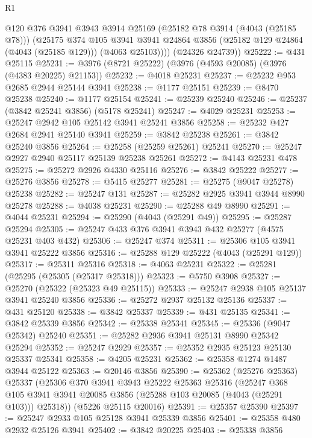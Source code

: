 \begin{lexlean}{R1}
\begin{coremodule}
          @120
          @376
          @3941
          @3943
          @3914
          @25169
          (@25182 @78 @3914 (@4043 (@25185 @78)))
          (@25175
            @374
            @105
            @3941
            @3941
            @24864
            @3856
            (@25182 @129 @24864 (@4043 (@25185 @129)))
            (@4063 @25103))))
      (@24326 @24739))
@25222 := @431 @25115
@25231 := @3976 (@8721 @25222) (@3976 (@4593 @20085) (@3976 (@4383 @20225) @21153))
@25232 := @4018 @25231
@25237 := @25232 @953 @2685 @2944 @25144 @3941
@25238 := @1177 @25151
@25239 := @8470 @25238
@25240 := @1177 @25154
@25241 := @25239 @25240
@25246 := @25237 (@3842 @25241 @3856) (@5178 @25241)
@25247 := @4029 @25231
@25253 := @25247 @2942 @105 @25142 @3941 @25241 @3856
@25258 := @25232 @427 @2684 @2941 @25140 @3941
@25259 := @3842 @25238
@25261 := @3842 @25240 @3856
@25264 := @25258 (@25259 @25261) @25241
@25270 := @25247 @2927 @2940 @25117 @25139 @25238 @25261
@25272 := @4143 @25231 @478
@25275 := @25272 @2926 @4330 @25116
@25276 := @3842 @25222
@25277 := @25276 @3856
@25278 := @5415 @25277
@25281 := @25275 (@9047 @25278) @25238
@25282 := @25247 @131
@25287 := @25282 @2925 @3941 @3944 @8990 @25278
@25288 := @4038 @25231
@25290 := @25288 @49 @8990
@25291 := @4044 @25231
@25294 := @25290 (@4043 (@25291 @49))
@25295 := @25287 @25294
@25305 := @25247 @433 @376 @3941 @3943 @432 @25277 (@4575 @25231 @403 @432)
@25306 := @25247 @374
@25311 := @25306 @105 @3941 @3941 @25222 @3856
@25316 := @25288 @129 @25222 (@4043 (@25291 @129))
@25317 := @25311 @25316
@25318 := @4063 @25231
@25322 := @25281 (@25295 (@25305 (@25317 @25318)))
@25323 := @5750 @3908
@25327 := @25270 (@25322 (@25323 @49 @25115))
@25333 := @25247 @2938 @105 @25137 @3941 @25240 @3856
@25336 := @25272 @2937 @25132 @25136
@25337 := @431 @25120
@25338 := @3842 @25337
@25339 := @431 @25135
@25341 := @3842 @25339 @3856
@25342 := @25338 @25341
@25345 := @25336 (@9047 @25342) @25240
@25351 := @25282 @2936 @3941 @25131 @8990 @25342 @25294
@25352 := @25247 @2929
@25357 := @25352 @2935 @25123 @25130 @25337 @25341
@25358 := @4205 @25231
@25362 := @25358 @1274 @1487 @3944 @25122
@25363 := @20146 @3856
@25390 := @25362
    (@25276 @25363)
    @25337
    (@25306
      @370
      @3941
      @3943
      @25222
      @25363
      @25316
      (@25247 @368 @105 @3941 @3941 @20085 @3856 (@25288 @103 @20085 (@4043 (@25291 @103))) @25318))
    (@5226 @25115 @20016)
@25391 := @25357 @25390
@25397 := @25247 @2933 @105 @25128 @3941 @25339 @3856
@25401 := @25358 @480 @2932 @25126 @3941
@25402 := @3842 @20225
@25403 := @25338 @3856

\end{coremodule}
\end{lexlean}
